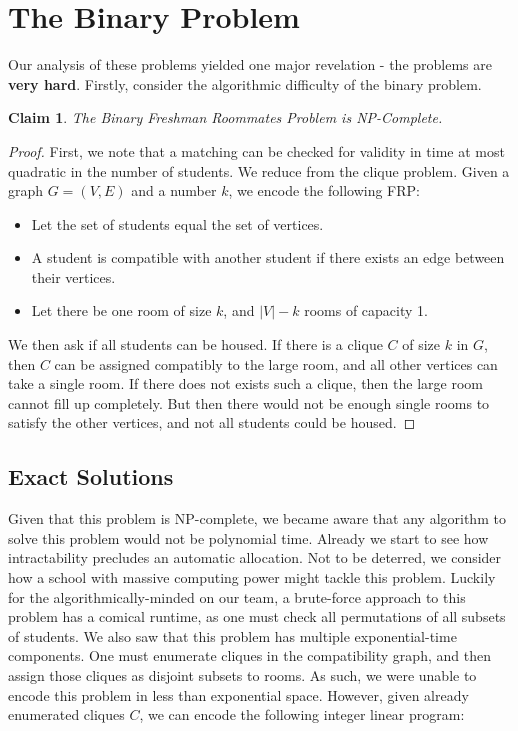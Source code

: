 \documentclass[12pt]{article}
\newtheorem*{claim*}{Claim}
\begin{document}
\section*{The Binary Problem}
Our analysis of these problems yielded one major revelation - the problems are \textbf{very hard}. Firstly, consider the algorithmic difficulty of the binary problem.

\begin{claim*}
The Binary Freshman Roommates Problem is NP-Complete.
\end{claim*}

\begin{proof}
First, we note that a matching can be checked for validity in time at most quadratic in the number of students. We reduce from the clique problem. Given a graph $G = (V, E)$ and a number $k$, we encode the following FRP:
\begin{itemize}
\item Let the set of students equal the set of vertices.
\item A student is compatible with another student if there exists an edge between their vertices.
\item Let there be one room of size $k$, and $|V| - k$ rooms of capacity 1.
\end{itemize}
We then ask if all students can be housed. If there is a clique $C$ of size $k$ in $G$, then $C$ can be assigned compatibly to the large room, and all other vertices can take a single room. If there does not exists such a clique, then the large room cannot fill up completely. But then there would not be enough single rooms to satisfy the other vertices, and not all students could be housed. 
\end{proof}


\subsection*{Exact Solutions}
Given that this problem is NP-complete, we became aware that any algorithm to solve this problem would not be polynomial time. Already we start to see how intractability precludes an automatic allocation. Not to be deterred, we consider how a school with massive computing power might tackle this problem. Luckily for the algorithmically-minded on our team, a brute-force approach to this problem has a comical runtime, as one  must check all permutations of all subsets of students. We also saw that this problem has multiple exponential-time components. One must enumerate cliques in the compatibility graph, and then assign those cliques as disjoint subsets to rooms. As such, we were unable to encode this problem in less than exponential space. However, given already enumerated cliques $C$, we can encode the following integer linear program:
\end{document}
